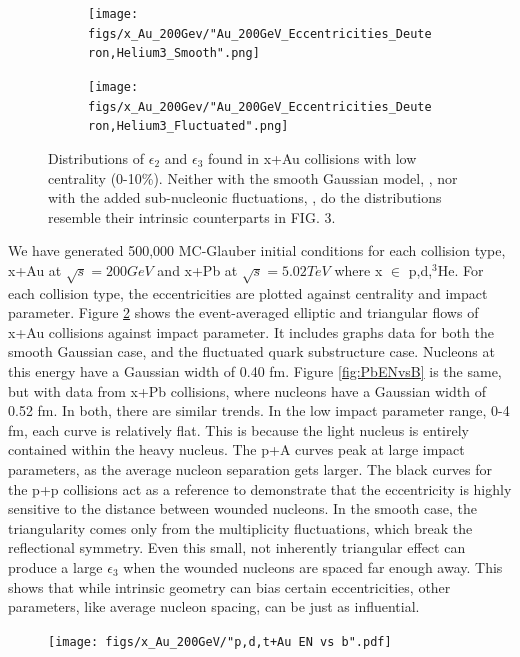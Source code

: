 \documentclass[preprint,showpacs,amsfonts,aps,prl,nofootinbib,floatfix]{revtex4}
\begin{document}
\begin{figure}
	\centering
	\begin{subfigure}[h]{0.4\linewidth}
		\centering
		\texttt{[image: figs/x\_Au\_200Gev/"Au\_200GeV\_Eccentricities\_Deuteron,Helium3\_Smooth".png]}
		\subcaption{\label{subfig:SmCentAu}}
	\end{subfigure}
	\begin{subfigure}[h]{0.4\linewidth}
		\centering
		\texttt{[image: figs/x\_Au\_200Gev/"Au\_200GeV\_Eccentricities\_Deuteron,Helium3\_Fluctuated".png]}
		\subcaption{\label{subfig:FlCentAu}}
	\end{subfigure}
	\caption{Distributions of $\epsilon_2$ and $\epsilon_3$ found in x+Au collisions with low centrality (0-10\%). Neither with the smooth Gaussian model, , nor with the added sub-nucleonic fluctuations, , do the distributions resemble their intrinsic counterparts in FIG. 3.}
	\label{fig:SmFlCentAu}
\end{figure}
We have generated 500,000 MC-Glauber initial conditions for each collision type, x+Au at $\sqrt{s} = 200GeV$ and x+Pb at $\sqrt{s} = 5.02TeV$ where x $\in$ {p,d,$^3$He}. For each collision type, the eccentricities are plotted against centrality and impact parameter. Figure \ref{fig:AuENvsB} shows the event-averaged elliptic and triangular flows of x+Au collisions against impact parameter. It includes graphs data for both the smooth Gaussian case, and the fluctuated quark substructure case. Nucleons at this energy have a Gaussian width of 0.40 fm. Figure \ref{fig:PbENvsB} is the same, but with data from x+Pb collisions, where nucleons have a Gaussian width of 0.52 fm. In both, there are similar trends. In the low impact parameter range, 0-4 fm, each curve is relatively flat. This is because the light nucleus is entirely contained within the heavy nucleus. The p+A curves peak at large impact parameters, as the average nucleon separation gets larger. The black curves for the p+p collisions act as a reference to demonstrate that the eccentricity is highly sensitive to the distance between wounded nucleons. In the smooth case, the triangularity comes only from the multiplicity fluctuations, which break the reflectional symmetry. Even this small, not inherently triangular effect can produce a large $\epsilon_3$ when the wounded nucleons are spaced far enough away. This shows that while intrinsic geometry can bias certain eccentricities, other parameters, like average nucleon spacing, can be just as influential.
\begin{figure}[ht]
	\centering
	\texttt{[image: figs/x\_Au\_200GeV/"p,d,t+Au EN vs b".pdf]}
	\caption{}
	\label{fig:AuENvsB}
\end{figure}
\end{document}
